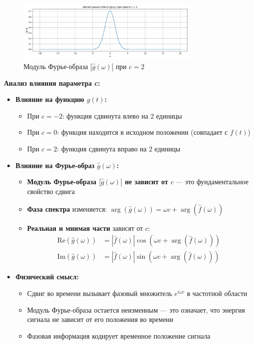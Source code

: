 \begin{figure}[H]
    \centering
    \includegraphics[width=0.8\textwidth]{g_hat_magnitude_c2.png}
    \caption{Модуль Фурье-образа $|\hat{g}(\omega)|$ при $c = 2$}
\end{figure}

\textbf{Анализ влияния параметра c:}

\begin{itemize}
    \item \textbf{Влияние на функцию $g(t)$:}
    \begin{itemize}
        \item При $c = -2$: функция сдвинута влево на 2 единицы
        \item При $c = 0$: функция находится в исходном положении (совпадает с $f(t)$)
        \item При $c = 2$: функция сдвинута вправо на 2 единицы
    \end{itemize}
    
    \item \textbf{Влияние на Фурье-образ $\hat{g}(\omega)$:}
    \begin{itemize}
        \item \textbf{Модуль Фурье-образа $|\hat{g}(\omega)|$ не зависит от $c$} — это фундаментальное свойство сдвига
        \item \textbf{Фаза спектра} изменяется: $\arg(\hat{g}(\omega)) = \omega c + \arg(\hat{f}(\omega))$
        \item \textbf{Реальная и мнимая части} зависят от $c$:
        \begin{align*}
            \text{Re}(\hat{g}(\omega)) &= |\hat{f}(\omega)| \cos(\omega c + \arg(\hat{f}(\omega))) \\
            \text{Im}(\hat{g}(\omega)) &= |\hat{f}(\omega)| \sin(\omega c + \arg(\hat{f}(\omega)))
        \end{align*}
    \end{itemize}
    
    \item \textbf{Физический смысл:}
    \begin{itemize}
        \item Сдвиг во времени вызывает фазовый множитель $e^{i \omega c}$ в частотной области
        \item Модуль Фурье-образа остается неизменным — это означает, что энергия сигнала не зависит от его положения во времени
        \item Фазовая информация кодирует временное положение сигнала
    \end{itemize}
    

\end{itemize}
